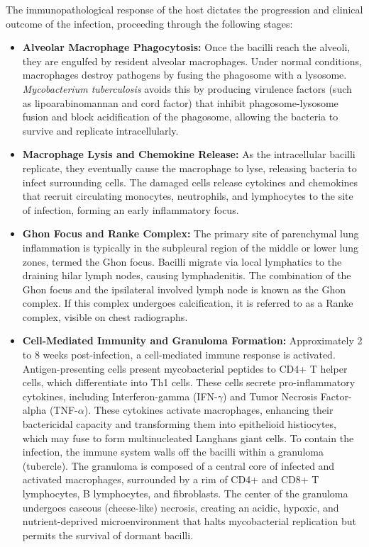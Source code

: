The immunopathological response of the host dictates the progression and clinical outcome of the infection, proceeding through the following stages:
\begin{itemize}
    \item \textbf{Alveolar Macrophage Phagocytosis:} Once the bacilli reach the alveoli, they are engulfed by resident alveolar macrophages. Under normal conditions, macrophages destroy pathogens by fusing the phagosome with a lysosome. \textit{Mycobacterium tuberculosis} avoids this by producing virulence factors (such as lipoarabinomannan and cord factor) that inhibit phagosome-lysosome fusion and block acidification of the phagosome, allowing the bacteria to survive and replicate intracellularly.
    \item \textbf{Macrophage Lysis and Chemokine Release:} As the intracellular bacilli replicate, they eventually cause the macrophage to lyse, releasing bacteria to infect surrounding cells. The damaged cells release cytokines and chemokines that recruit circulating monocytes, neutrophils, and lymphocytes to the site of infection, forming an early inflammatory focus.
    \item \textbf{Ghon Focus and Ranke Complex:} The primary site of parenchymal lung inflammation is typically in the subpleural region of the middle or lower lung zones, termed the Ghon focus. Bacilli migrate via local lymphatics to the draining hilar lymph nodes, causing lymphadenitis. The combination of the Ghon focus and the ipsilateral involved lymph node is known as the Ghon complex. If this complex undergoes calcification, it is referred to as a Ranke complex, visible on chest radiographs.
    \item \textbf{Cell-Mediated Immunity and Granuloma Formation:} Approximately 2 to 8 weeks post-infection, a cell-mediated immune response is activated. Antigen-presenting cells present mycobacterial peptides to CD4+ T helper cells, which differentiate into Th1 cells. These cells secrete pro-inflammatory cytokines, including Interferon-gamma (IFN-$\gamma$) and Tumor Necrosis Factor-alpha (TNF-$\alpha$). These cytokines activate macrophages, enhancing their bactericidal capacity and transforming them into epithelioid histiocytes, which may fuse to form multinucleated Langhans giant cells.
    To contain the infection, the immune system walls off the bacilli within a granuloma (tubercle). The granuloma is composed of a central core of infected and activated macrophages, surrounded by a rim of CD4+ and CD8+ T lymphocytes, B lymphocytes, and fibroblasts. The center of the granuloma undergoes caseous (cheese-like) necrosis, creating an acidic, hypoxic, and nutrient-deprived microenvironment that halts mycobacterial replication but permits the survival of dormant bacilli.

\end{itemize}
